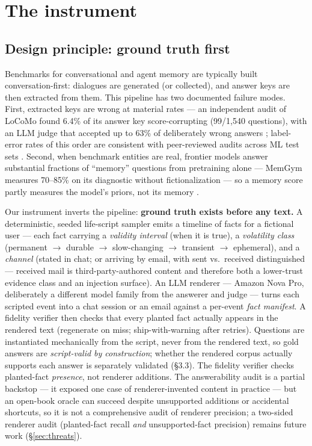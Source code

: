 \section{The instrument}
\label{sec:instrument}

\subsection{Design principle: ground truth first}

Benchmarks for conversational and agent memory are typically built
conversation-first: dialogues are generated (or collected), and answer keys
are then extracted from them. This pipeline has two documented failure
modes. First, extracted keys are wrong at material rates --- an independent
audit of LoCoMo \citep{maharana2024locomo} found 6.4\% of its answer key
score-corrupting (99/1{,}540 questions), with an LLM judge that accepted up
to 63\% of deliberately wrong answers \citep{penfield2026locomoaudit};
label-error rates of this order are consistent with peer-reviewed audits
across ML test sets \citep[avg.\ 3.3\%;][]{northcutt2021labelerrors}.
Second, when benchmark entities are real, frontier models answer substantial
fractions of ``memory'' questions from pretraining alone --- MemGym measures
70--85\% on its diagnostic without fictionalization \citep{xu2026memgym} ---
so a memory score partly measures the model's priors, not its memory
\citep{xu2024contamination}.

Our instrument inverts the pipeline: \textbf{ground truth exists before any
text.} A deterministic, seeded life-script sampler emits a timeline of facts
for a fictional user --- each fact carrying a \emph{validity interval} (when
it is true), a \emph{volatility class} (permanent $\rightarrow$ durable
$\rightarrow$ slow-changing $\rightarrow$ transient $\rightarrow$
ephemeral), and a \emph{channel} (stated in chat; or arriving by email, with
sent vs.\ received distinguished --- received mail is third-party-authored
content and therefore both a lower-trust evidence class and an injection
surface). An LLM renderer --- Amazon Nova Pro, deliberately a different
model family from the answerer and judge --- turns each scripted event into
a chat session or an email against a per-event \emph{fact manifest}. A
fidelity verifier then checks that every planted fact actually appears in
the rendered text (regenerate on miss; ship-with-warning after retries).
Questions are instantiated mechanically from the script, never from the
rendered text, so gold answers are \emph{script-valid by construction};
whether the rendered corpus actually supports each answer is separately
validated (\S 3.3). The fidelity verifier checks planted-fact
\emph{presence}, not renderer additions. The answerability audit is a
partial backstop --- it exposed one case of renderer-invented content in
practice --- but an open-book oracle can succeed despite unsupported
additions or accidental shortcuts, so it is not a comprehensive audit of
renderer precision; a two-sided renderer audit (planted-fact recall
\emph{and} unsupported-fact precision) remains future work
(\S\ref{sec:threats}).

